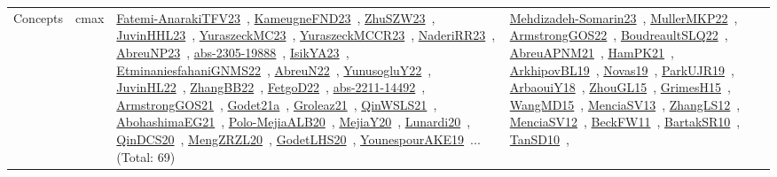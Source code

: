 {\begin{longtable}{lp{3cm}>{\raggedright\arraybackslash}p{6cm}>{\raggedright\arraybackslash}p{6cm}>{\raggedright\arraybackslash}p{8cm}}
Concepts & cmax & \href{../works/Fatemi-AnarakiTFV23.pdf}{Fatemi-AnarakiTFV23}~\cite{Fatemi-AnarakiTFV23}, \href{../works/KameugneFND23.pdf}{KameugneFND23}~\cite{KameugneFND23}, \href{../works/ZhuSZW23.pdf}{ZhuSZW23}~\cite{ZhuSZW23}, \href{../works/JuvinHHL23.pdf}{JuvinHHL23}~\cite{JuvinHHL23}, \href{../works/YuraszeckMC23.pdf}{YuraszeckMC23}~\cite{YuraszeckMC23}, \href{../works/YuraszeckMCCR23.pdf}{YuraszeckMCCR23}~\cite{YuraszeckMCCR23}, \href{../works/NaderiRR23.pdf}{NaderiRR23}~\cite{NaderiRR23}, \href{../works/AbreuNP23.pdf}{AbreuNP23}~\cite{AbreuNP23}, \href{../works/abs-2305-19888.pdf}{abs-2305-19888}~\cite{abs-2305-19888}, \href{../works/IsikYA23.pdf}{IsikYA23}~\cite{IsikYA23}, \href{../works/EtminaniesfahaniGNMS22.pdf}{EtminaniesfahaniGNMS22}~\cite{EtminaniesfahaniGNMS22}, \href{../works/AbreuN22.pdf}{AbreuN22}~\cite{AbreuN22}, \href{../works/YunusogluY22.pdf}{YunusogluY22}~\cite{YunusogluY22}, \href{../works/JuvinHL22.pdf}{JuvinHL22}~\cite{JuvinHL22}, \href{../works/ZhangBB22.pdf}{ZhangBB22}~\cite{ZhangBB22}, \href{../works/FetgoD22.pdf}{FetgoD22}~\cite{FetgoD22}, \href{../works/abs-2211-14492.pdf}{abs-2211-14492}~\cite{abs-2211-14492}, \href{../works/ArmstrongGOS21.pdf}{ArmstrongGOS21}~\cite{ArmstrongGOS21}, \href{../works/Godet21a.pdf}{Godet21a}~\cite{Godet21a}, \href{../works/Groleaz21.pdf}{Groleaz21}~\cite{Groleaz21}, \href{../works/QinWSLS21.pdf}{QinWSLS21}~\cite{QinWSLS21}, \href{../works/AbohashimaEG21.pdf}{AbohashimaEG21}~\cite{AbohashimaEG21}, \href{../works/Polo-MejiaALB20.pdf}{Polo-MejiaALB20}~\cite{Polo-MejiaALB20}, \href{../works/MejiaY20.pdf}{MejiaY20}~\cite{MejiaY20}, \href{../works/Lunardi20.pdf}{Lunardi20}~\cite{Lunardi20}, \href{../works/QinDCS20.pdf}{QinDCS20}~\cite{QinDCS20}, \href{../works/MengZRZL20.pdf}{MengZRZL20}~\cite{MengZRZL20}, \href{../works/GodetLHS20.pdf}{GodetLHS20}~\cite{GodetLHS20}, \href{../works/YounespourAKE19.pdf}{YounespourAKE19}~\cite{YounespourAKE19}... (Total: 69) & \href{../works/Mehdizadeh-Somarin23.pdf}{Mehdizadeh-Somarin23}~\cite{Mehdizadeh-Somarin23}, \href{../works/MullerMKP22.pdf}{MullerMKP22}~\cite{MullerMKP22}, \href{../works/ArmstrongGOS22.pdf}{ArmstrongGOS22}~\cite{ArmstrongGOS22}, \href{../works/BoudreaultSLQ22.pdf}{BoudreaultSLQ22}~\cite{BoudreaultSLQ22}, \href{../works/AbreuAPNM21.pdf}{AbreuAPNM21}~\cite{AbreuAPNM21}, \href{../works/HamPK21.pdf}{HamPK21}~\cite{HamPK21}, \href{../works/ArkhipovBL19.pdf}{ArkhipovBL19}~\cite{ArkhipovBL19}, \href{../works/Novas19.pdf}{Novas19}~\cite{Novas19}, \href{../works/ParkUJR19.pdf}{ParkUJR19}~\cite{ParkUJR19}, \href{../works/ArbaouiY18.pdf}{ArbaouiY18}~\cite{ArbaouiY18}, \href{../works/ZhouGL15.pdf}{ZhouGL15}~\cite{ZhouGL15}, \href{../works/GrimesH15.pdf}{GrimesH15}~\cite{GrimesH15}, \href{../works/WangMD15.pdf}{WangMD15}~\cite{WangMD15}, \href{../works/MenciaSV13.pdf}{MenciaSV13}~\cite{MenciaSV13}, \href{../works/ZhangLS12.pdf}{ZhangLS12}~\cite{ZhangLS12}, \href{../works/MenciaSV12.pdf}{MenciaSV12}~\cite{MenciaSV12}, \href{../works/BeckFW11.pdf}{BeckFW11}~\cite{BeckFW11}, \href{../works/BartakSR10.pdf}{BartakSR10}~\cite{BartakSR10}, \href{../works/TanSD10.pdf}{TanSD10}~\cite{TanSD10}, 
\end{longtable}}
